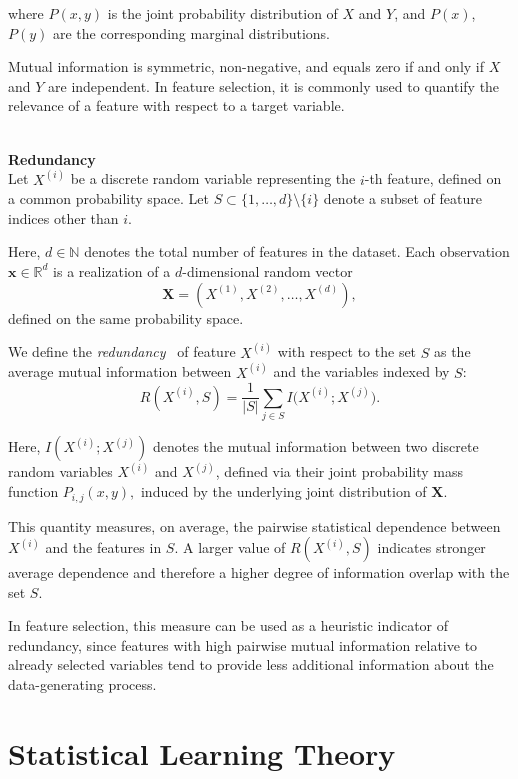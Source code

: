 where $P(x,y)$ is the joint probability distribution of $X$ and $Y$, and $P(x)$, $P(y)$ are the corresponding marginal distributions.

Mutual information is symmetric, non-negative, and equals zero if and only if $X$ and $Y$ are independent. In feature selection, it is commonly used to quantify the relevance of a feature with respect to a target variable.


\textbf{\\Redundancy\\}
Let $X^{(i)}$ be a discrete random variable representing the $i$-th feature, defined \break on a common probability space. Let $S \subset \{1,\dots,d\} \setminus \{i\}$ denote a subset of feature indices other than $i$.

Here, $d \in \mathbb{N}$ denotes the total number of features in the dataset. Each observation $\mathbf{x} \in \mathbb{R}^d$ is a realization of a $d$-dimensional random vector
\[
\mathbf{X} = (X^{(1)},X^{(2)}, \dots, X^{(d)}),
\]
defined on the same probability space.

We define the \emph{redundancy}~\cite{peng2005} of feature $X^{(i)}$ with respect to the set $S$ as the average mutual information between $X^{(i)}$ and the variables indexed by $S$:
\begin{equation*}
R(X^{(i)}, S) = \frac{1}{|S|} \sum_{j \in S} I\bigl(X^{(i)}; X^{(j)}\bigr).
\end{equation*}

Here, $I(X^{(i)}; X^{(j)})$ denotes the mutual information between two discrete random variables $X^{(i)}$ and $X^{(j)}$, defined via their joint probability mass function
$P_{i,j}(x,y),$ induced by the underlying joint distribution of $\mathbf{X}$.

This quantity measures, on average, the pairwise statistical dependence between $X^{(i)}$ and the features in $S$. A larger value of $R(X^{(i)}, S)$ indicates stronger average dependence and therefore a higher degree of information overlap with the set $S$.

In feature selection, this measure can be used as a heuristic indicator of redundancy, since features with high pairwise mutual information relative to already selected variables tend to provide less additional information about the data-generating process.



\section{Statistical Learning Theory}
\label{sec:generalization-neural-networks}

